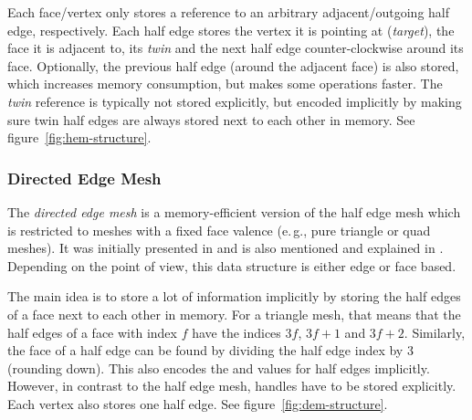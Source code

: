 Each face/vertex only stores a reference to an arbitrary adjacent/outgoing half edge, respectively.
Each half edge stores the vertex it is pointing at (\emph{target}), the face it is adjacent to, its \emph{twin} and the next half edge counter-clockwise around its face.
Optionally, the previous half edge (around the adjacent face) is also stored, which increases memory consumption, but makes some operations faster.
The \emph{twin} reference is typically not stored explicitly, but encoded implicitly by making sure twin half edges are always stored next to each other in memory.
See figure~\ref{fig:hem-structure}.


\newpage
\subsubsection*{Directed Edge Mesh}

The \emph{directed edge mesh} is a memory-efficient version of the half edge mesh which is restricted to meshes with a fixed face valence (e.\,g., pure triangle or quad meshes).
It was initially presented in \cite{campagna1998directed} and is also mentioned and explained in \cite[Chapter~2]{botsch2010polygon}.
Depending on the point of view, this data structure is either edge or face based.

The main idea is to store a lot of information implicitly by storing the half edges of a face next to each other in memory.
For a triangle mesh, that means that the half edges of a face with index $f$ have the indices $3f$, $3f + 1$ and $3f + 2$.
Similarly, the face of a half edge can be found by dividing the half edge index by 3 (rounding down).
This also encodes the  and  values for half edges implicitly.
However, in contrast to the half edge mesh,  handles have to be stored explicitly.
Each vertex also stores one  half edge.
See figure~\ref{fig:dem-structure}.

